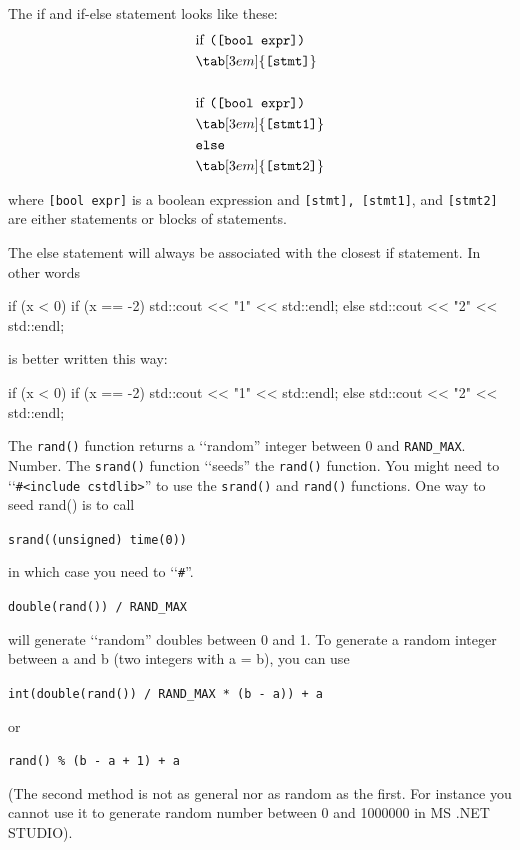 


\newpage{}

The if and if-else statement looks like these:
\begin{align*}
&\text{if \texttt{([bool expr])}}\\
&\tab[3em]{\texttt{[stmt]}}\\\\
&\text{if \texttt{([bool expr])}}\\
&\tab[3em]{\texttt{[stmt1]}}\\
&\texttt{else}\\
&\tab[3em]{\texttt{[stmt2]}}\\
\end{align*}

where \texttt{[bool expr]} is a boolean expression and
\texttt{[stmt], [stmt1]}, and \texttt{[stmt2]} are either
statements or blocks of statements.

The else statement will always be associated with the closest if
statement. In other words
\begin{console}
if (x < 0)
   if (x == -2) std::cout << "1" << std::endl;
else
      std::cout << "2" << std::endl;
\end{console}

is better written this way:
\begin{console}
if (x < 0)
   if (x == -2)
       std::cout << "1" << std::endl;
   else
       std::cout << "2" << std::endl;
\end{console}

The \texttt{rand()} function returns a \lq\lq random'' integer between 0 and
\texttt{RAND\_MAX}. Number. The \texttt{srand()} function \lq\lq seeds'' the
\texttt{rand()} function. You might need to \lq\lq \texttt{\#<include
 cstdlib>}'' to use the \texttt{srand()} and
\texttt{rand()} functions. One way to seed rand() is to call
\begin{center}
\texttt{srand((unsigned) time(0))}
\end{center}
in which case you need to \lq\lq \texttt{\#<include  ctime>}''.
\begin{center}
\texttt{double(rand()) / RAND\_MAX}
\end{center}
will generate \lq\lq random'' doubles between 0 and 1. To generate a random
integer between a and b (two integers with a = b), you can use
\begin{center}
\texttt{int(double(rand()) / RAND\_MAX * (b - a)) + a}
\end{center}
or
\begin{center}
\texttt{rand() \% (b - a + 1) + a}
\end{center}
(The second method is not as general nor as random as the first. For
instance you cannot use it to generate random number between 0 and
1000000 in MS .NET STUDIO).

